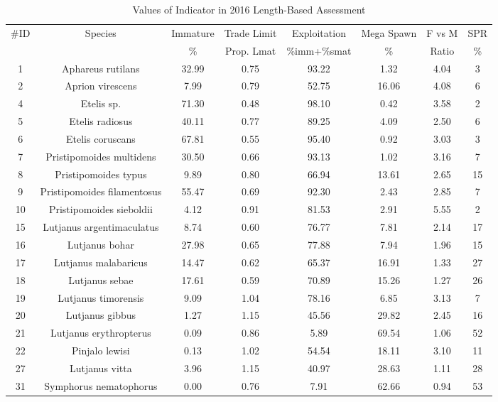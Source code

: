 \documentclass{report}\usepackage[]{graphicx}\usepackage[]{color}
\begin{document}
\begin{table}[ht]
\centering
\caption{Values of Indicator in 2016 Length-Based Assessment} 
{\small
\begin{tabular}{cccccccc}
  \hline
\#ID & Species & Immature & Trade Limit & Exploitation & Mega Spawn & F vs M & SPR \\ 
  {} & {} & {\%} & {Prop. Lmat} & {\%imm+\%smat} & {\%} & {Ratio} & {\%} \\ \hline
  1 & Aphareus rutilans & 32.99 & 0.75 & 93.22 & 1.32 & 4.04 & 3 \\ 
    2 & Aprion virescens & 7.99 & 0.79 & 52.75 & 16.06 & 4.08 & 6 \\ 
    4 & Etelis sp. & 71.30 & 0.48 & 98.10 & 0.42 & 3.58 & 2 \\ 
    5 & Etelis radiosus & 40.11 & 0.77 & 89.25 & 4.09 & 2.50 & 6 \\ 
    6 & Etelis coruscans & 67.81 & 0.55 & 95.40 & 0.92 & 3.03 & 3 \\ 
    7 & Pristipomoides multidens & 30.50 & 0.66 & 93.13 & 1.02 & 3.16 & 7 \\ 
    8 & Pristipomoides typus & 9.89 & 0.80 & 66.94 & 13.61 & 2.65 & 15 \\ 
    9 & Pristipomoides filamentosus & 55.47 & 0.69 & 92.30 & 2.43 & 2.85 & 7 \\ 
   10 & Pristipomoides sieboldii & 4.12 & 0.91 & 81.53 & 2.91 & 5.55 & 2 \\ 
   15 & Lutjanus argentimaculatus & 8.74 & 0.60 & 76.77 & 7.81 & 2.14 & 17 \\ 
   16 & Lutjanus bohar & 27.98 & 0.65 & 77.88 & 7.94 & 1.96 & 15 \\ 
   17 & Lutjanus malabaricus & 14.47 & 0.62 & 65.37 & 16.91 & 1.33 & 27 \\ 
   18 & Lutjanus sebae & 17.61 & 0.59 & 70.89 & 15.26 & 1.27 & 26 \\ 
   19 & Lutjanus timorensis & 9.09 & 1.04 & 78.16 & 6.85 & 3.13 & 7 \\ 
   20 & Lutjanus gibbus & 1.27 & 1.15 & 45.56 & 29.82 & 2.45 & 16 \\ 
   21 & Lutjanus erythropterus & 0.09 & 0.86 & 5.89 & 69.54 & 1.06 & 52 \\ 
   22 & Pinjalo lewisi & 0.13 & 1.02 & 54.54 & 18.11 & 3.10 & 11 \\ 
   27 & Lutjanus vitta & 3.96 & 1.15 & 40.97 & 28.63 & 1.11 & 28 \\ 
   31 & Symphorus nematophorus & 0.00 & 0.76 & 7.91 & 62.66 & 0.94 & 53 \\ 

\end{tabular}}
\end{table}
\end{document}
